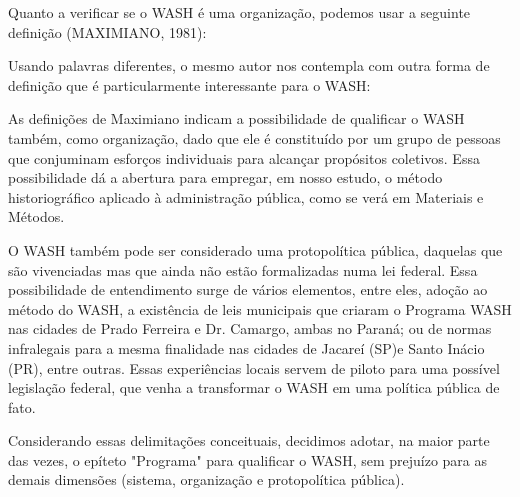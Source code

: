 Quanto a verificar se o WASH é uma organização, podemos usar a seguinte definição (MAXIMIANO, 1981):


\noindent\begin{flushright}\mbox{\linespread{1}\selectfont\centering{}}\end{flushright}


Usando palavras diferentes, o mesmo autor nos contempla com outra forma de definição que é particularmente interessante para o WASH:


\noindent\begin{flushright}\mbox{\linespread{1}\selectfont\centering{}}\end{flushright}


As definições de Maximiano indicam a possibilidade de qualificar o WASH também, como organização, dado que ele é constituído por um grupo de pessoas que conjuminam esforços individuais para alcançar propósitos coletivos. Essa possibilidade dá a abertura para empregar, em nosso estudo, o método historiográfico aplicado à administração pública, como se verá em Materiais e Métodos.

O WASH também pode ser considerado uma protopolítica pública, daquelas que são vivenciadas mas que ainda não estão formalizadas numa lei federal. Essa possibilidade de entendimento surge de vários elementos, entre eles, adoção ao método do WASH, a existência de leis municipais que criaram o Programa WASH nas cidades de Prado Ferreira e Dr. Camargo, ambas no Paraná; ou de normas infralegais para a mesma finalidade nas cidades de Jacareí (SP)e Santo Inácio (PR), entre outras. Essas experiências locais servem de piloto para uma possível legislação federal, que venha a transformar o WASH em uma política pública de fato.

Considerando essas delimitações conceituais, decidimos adotar, na maior parte das vezes, o epíteto "Programa" para qualificar o WASH, sem prejuízo para as demais dimensões (sistema, organização e protopolítica pública).

